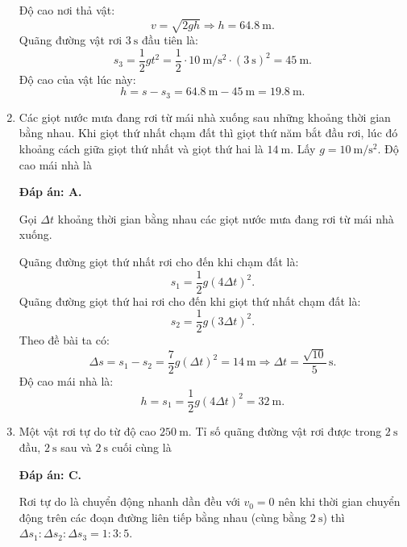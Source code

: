 \begin{enumerate}[label=\bfseries Câu \arabic*:]
{		Độ cao nơi thả vật:
		$$v=\sqrt{2gh}\Rightarrow h = \SI{64.8}{\meter}.$$
		Quãng đường vật rơi $\SI{3}{\second}$ đầu tiên là:
		$$s_3=\dfrac{1}{2}gt^2=\dfrac{1}{2}\cdot\SI{10}{\meter/\second^2}\cdot(\SI{3}{\second})^2=\SI{45}{\meter}.$$
		Độ cao của vật lúc này:
		$$h=s-s_3=\SI{64.8}{\meter}-\SI{45}{\meter}=\SI{19.8}{\meter}.$$
	}
	\item {}
	
	
	{Các giọt nước mưa đang rơi từ mái nhà xuống sau những khoảng thời gian bằng nhau. Khi giọt thứ nhất chạm đất thì giọt thứ năm bắt đầu rơi, lúc đó khoảng cách giữa giọt thứ nhất và giọt thứ hai là $\SI{14}{\meter}$. Lấy $g=\SI{10}{\meter/\second^2}$. Độ cao mái nhà là
	}
	\hideall
	{	\textbf{Đáp án: A.}
		
		Gọi $\Delta t$ khoảng thời gian bằng nhau các giọt nước mưa đang rơi từ mái nhà xuống.
		
		Quãng đường giọt thứ nhất rơi cho đến khi chạm đất là:
		$$s_1=\dfrac{1}{2}g(4\Delta t)^2.$$
		Quãng đường giọt thứ hai rơi cho đến khi giọt thứ nhất chạm đất là:
		$$s_2=\dfrac{1}{2}g(3\Delta t)^2.$$
		Theo đề bài ta có:
		$$\Delta s= s_1-s_2=\dfrac{7}{2}g(\Delta t)^2=\SI{14}{\meter}\Rightarrow \Delta t=\dfrac{\sqrt{10}}{5}\,\text{s}.$$
		Độ cao mái nhà là:
		$$h=s_1=\dfrac{1}{2}g(4\Delta t)^2=\SI{32}{\meter}.$$
	}
	
	
	\item {}
	
	
	{Một vật rơi tự do từ độ cao $250\ \text{m}$. Tỉ số quãng đường vật rơi được trong $2\ \text{s}$ đầu, $2\ \text{s}$ sau và $2\ \text{s}$ cuối cùng là
	}
	\hideall
	{	\textbf{Đáp án: C.}
		
		Rơi tự do là chuyển động nhanh dần đều với $v_0=0$  nên khi thời gian chuyển động trên các đoạn đường liên tiếp bằng nhau (cùng bằng $2\ \text{s}$) thì $\Delta s_1:\Delta s_2:\Delta s_3=1:3:5$.
	}


\end{enumerate}
